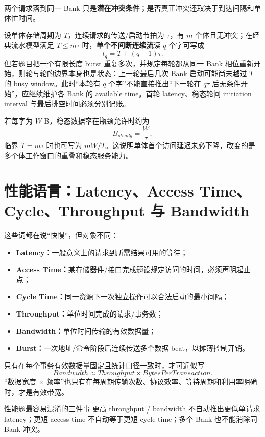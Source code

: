 \documentclass[UTF8,fontset=fandol,11pt,a4paper]{ctexart}
\newcommand{\kw}[1]{\textbf{\color{deep}#1}}\newcommand{\code}[1]{\texttt{#1}}
\begin{document}
两个请求落到同一 Bank 只是\textbf{潜在冲突条件}；是否真正冲突还取决于到达间隔和单体忙时间。

\begin{center}

\end{center}

设单体存储周期为 $T$，连续请求的传送/启动节拍为 $\tau$，有 $m$ 个体且无冲突；在经典流水模型满足 $T\le m\tau$ 时，\textbf{单个不间断连续流}读 $q$ 个字可写成
\[
t_q=T+(q-1)\tau.
\]
但若题目把一个有限长度 burst 重复多次，并规定每轮都从同一 Bank 相位重新开始，则轮与轮的边界本身也是状态：上一轮最后几次 Bank 启动可能尚未越过 $T$ 的 busy window。此时“本轮有 $q$ 个字”不能直接推出“下一轮在 $q\tau$ 后无条件开始”，应继续维护各 Bank 的 available time。首轮 latency、稳态轮间 initiation interval 与最后排空时间必须分别记账。

若每字为 $W$ B，稳态数据率在瓶颈允许时约为
\[
B_{steady}=\frac{W}{\tau},
\]
临界 $T=m\tau$ 时也可写为 $mW/T$。这说明单体首个访问延迟未必下降，改变的是多个体工作窗口的重叠和稳态服务能力。

\section{性能语言：Latency、Access Time、Cycle、Throughput 与 Bandwidth}
这些词都在说“快慢”，但对象不同：
\begin{itemize}
\item \kw{Latency：}一般意义上的请求到所需结果可用的等待；
\item \kw{Access Time：}某存储器件/接口完成题设规定访问的时间，必须声明起止点；
\item \kw{Cycle Time：}同一资源下一次独立操作可以合法启动的最小间隔；
\item \kw{Throughput：}单位时间完成的请求/事务数；
\item \kw{Bandwidth：}单位时间传输的有效数据量；
\item \kw{Burst：}一次地址/命令阶段后连续传送多个数据 beat，以摊薄控制开销。
\end{itemize}
只有在每个事务有效数据量固定且统计口径一致时，才可近似写
\[
Bandwidth\approx Throughput\times BytesPerTransaction.
\]
“数据宽度 $\times$ 频率”也只有在每周期传输次数、协议效率、等待周期和利用率明确时，才是有效带宽。

\begin{warnbox}{性能题最容易混淆的三件事}
更高 throughput / bandwidth 不自动推出更低单请求 latency；更短 access time 不自动等于更短 cycle time；多个 Bank 也不能消除同 Bank 冲突。
\end{warnbox}
\end{document}
